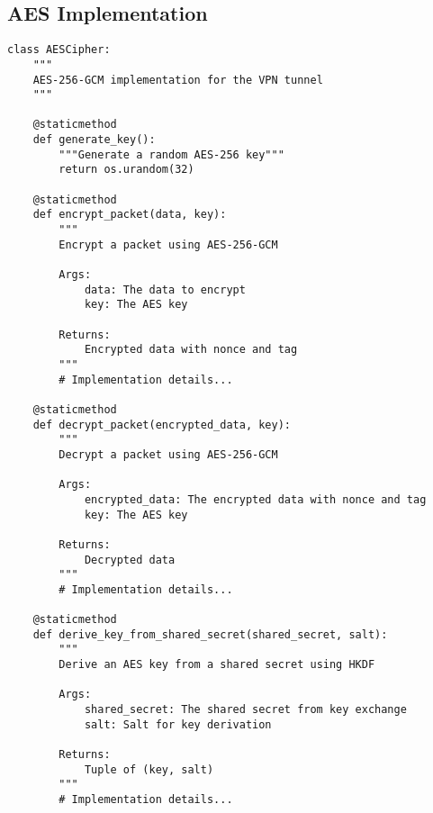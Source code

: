 \documentclass[12pt,a4paper]{report}
\begin{document}
\subsection{AES Implementation}
\begin{lstlisting}[style=python, caption=AES Implementation]
class AESCipher:
    """
    AES-256-GCM implementation for the VPN tunnel
    """
    
    @staticmethod
    def generate_key():
        """Generate a random AES-256 key"""
        return os.urandom(32)
        
    @staticmethod
    def encrypt_packet(data, key):
        """
        Encrypt a packet using AES-256-GCM
        
        Args:
            data: The data to encrypt
            key: The AES key
            
        Returns:
            Encrypted data with nonce and tag
        """
        # Implementation details...
        
    @staticmethod
    def decrypt_packet(encrypted_data, key):
        """
        Decrypt a packet using AES-256-GCM
        
        Args:
            encrypted_data: The encrypted data with nonce and tag
            key: The AES key
            
        Returns:
            Decrypted data
        """
        # Implementation details...
        
    @staticmethod
    def derive_key_from_shared_secret(shared_secret, salt):
        """
        Derive an AES key from a shared secret using HKDF
        
        Args:
            shared_secret: The shared secret from key exchange
            salt: Salt for key derivation
            
        Returns:
            Tuple of (key, salt)
        """
        # Implementation details...
\end{lstlisting}
\end{document}

